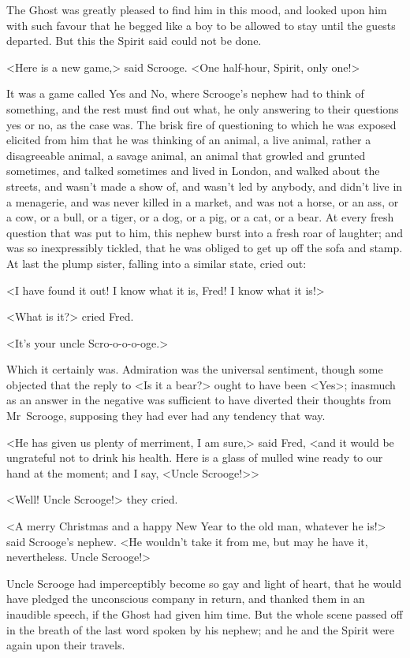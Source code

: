 The Ghost was greatly pleased to find him in this mood, and looked upon him with such favour that he begged like a boy to be allowed to stay until the guests departed. But this the Spirit said could not be done.

<Here is a new game,> said Scrooge. <One half-hour, Spirit, only one!>

It was a game called Yes and No, where Scrooge's nephew had to think of something, and the rest must find out what, he only answering to their questions yes or no, as the case was. The brisk fire of questioning to which he was exposed elicited from him that he was thinking of an animal, a live animal, rather a disagreeable animal, a savage animal, an animal that growled and grunted sometimes, and talked sometimes and lived in London, and walked about the streets, and wasn't made a show of, and wasn't led by anybody, and didn't live in a menagerie, and was never killed in a market, and was not a horse, or an ass, or a cow, or a bull, or a tiger, or a dog, or a pig, or a cat, or a bear. At every fresh question that was put to him, this nephew burst into a fresh roar of laughter; and was so inexpressibly tickled, that he was obliged to get up off the sofa and stamp. At last the plump sister, falling into a similar state, cried out:

<I have found it out! I know what it is, Fred! I know what it is!>

<What is it?> cried Fred.

<It's your uncle Scro-o-o-o-oge.>

Which it certainly was. Admiration was the universal sentiment, though some objected that the reply to <Is it a bear?> ought to have been <Yes>; inasmuch as an answer in the negative was sufficient to have diverted their thoughts from Mr~Scrooge, supposing they had ever had any tendency that way.

<He has given us plenty of merriment, I am sure,> said Fred, <and it would be ungrateful not to drink his health. Here is a glass of mulled wine ready to our hand at the moment; and I say, <Uncle Scrooge!>>

<Well! Uncle Scrooge!> they cried.

<A merry Christmas and a happy New Year to the old man, whatever he is!> said Scrooge's nephew. <He wouldn't take it from me, but may he have it, nevertheless. Uncle Scrooge!>

Uncle Scrooge had imperceptibly become so gay and light of heart, that he would have pledged the unconscious company in return, and thanked them in an inaudible speech, if the Ghost had given him time. But the whole scene passed off in the breath of the last word spoken by his nephew; and he and the Spirit were again upon their travels.

